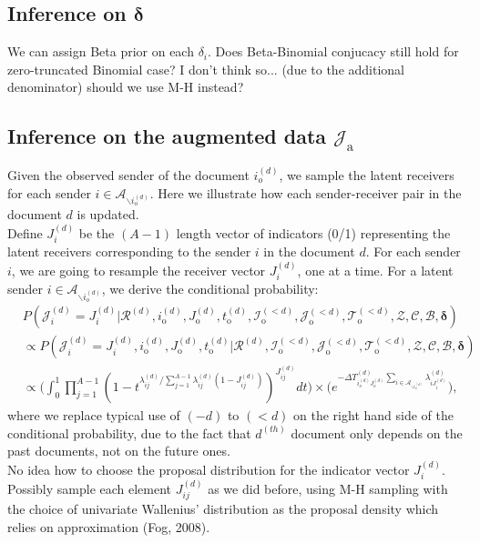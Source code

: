 \documentclass[a4paper]{article}
\begin{document}
\subsection{Inference on $\boldsymbol{\delta}$}
We can assign Beta prior on each $\delta_i$. Does Beta-Binomial conjucacy still hold for zero-truncated Binomial case? I don't think so... (due to the additional denominator) should we use M-H instead?
\subsection{Inference on the augmented data $\mathcal{J}_{\mbox{a}}$}
Given the observed sender of the document $i_o^{(d)}$, we sample the latent receivers for each sender $i \in \mathcal{A}_{\backslash i_o^{(d)}}$. Here we illustrate how each sender-receiver pair in the document $d$ is updated.\\\newline
Define ${J}^{(d)}_{i}$ be the $(A-1)$ length vector of indicators (0/1) representing the latent receivers corresponding to the sender $i$ in the document $d$. For each sender $i$, we are going to resample the receiver vector ${J}^{(d)}_{i}$, one at a time. For a latent sender $i \in \mathcal{A}_{\backslash i_o^{(d)}}$, we derive the conditional probability:\\
\begin{equation}
	\begin{aligned}
		&P(\mathcal{J}^{(d)}_{i} = {J}^{(d)}_{i}|\mathcal{R}^{(d)}, i^{(d)}_{\mbox{o}}, J^{(d)}_{\mbox{o}}, t^{(d)}_{\mbox{o}}, \mathcal{I}^{(<d)}_{\mbox{o}}, \mathcal{J}^{(<d)}_{\mbox{o}}, \mathcal{T}^{(<d)}_{\mbox{o}}, \mathcal{Z}, \mathcal{C}, \mathcal{B}, \boldsymbol{\delta})\\&\propto P(\mathcal{J}^{(d)}_{i} ={J}^{(d)}_{i}, i^{(d)}_{\mbox{o}}, J^{(d)}_{\mbox{o}}, t^{(d)}_{\mbox{o}}|\mathcal{R}^{(d)}, \mathcal{I}^{(<d)}_{\mbox{o}}, \mathcal{J}^{(<d)}_{\mbox{o}}, \mathcal{T}^{(<d)}_{\mbox{o}}, \mathcal{Z}, \mathcal{C}, \mathcal{B}, \boldsymbol{\delta})
		\\&\propto  \Big(\int_0^1\prod_{j=1}^{A-1}(1-t^{\lambda_{ij}^{(d)} /  \sum_{j = 1}^{A-1} \lambda_{ij}^{(d)}(1-J_{ij}^{(d)})})^{J_{ij}^{(d)}}dt \Big)\times \Big(e^{-\Delta T^{(d)}_{i_o^{(d)}J_o^{(d)}}\sum\limits_{i\in \mathcal{A}_{\backslash i_o^{(d)}}}\lambda^{(d)}_{iJ^{(d)}_{i}}}\Big),
	\end{aligned}
\end{equation}
where we replace typical use of $(-d)$ to $(<d)$ on the right hand side of the conditional probability, due to the fact that $d^{(th)}$ document only depends on the past documents, not on the future ones.\\ \newline
No idea how to choose the proposal distribution for the indicator vector $J_i^{(d)}$. Possibly sample each element $J_{ij}^{(d)}$ as we did before, using M-H sampling with the choice of univariate Wallenius' distribution as the proposal density which relies on approximation (Fog, 2008).
\end{document}
